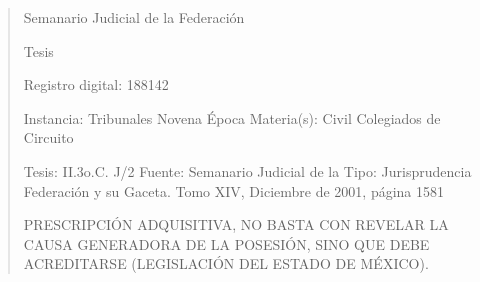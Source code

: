 \documentclass[11pt,a4paper]{article}
\begin{document}
\begin{quote}
                                                   Semanario Judicial de la Federación

                                                  Tesis

 Registro digital: 188142

 Instancia: Tribunales            Novena Época                           Materia(s): Civil
 Colegiados de Circuito

 Tesis: II.3o.C. J/2              Fuente: Semanario Judicial de la       Tipo: Jurisprudencia
                                  Federación y su Gaceta.
                                  Tomo XIV, Diciembre de 2001,
                                  página 1581


PRESCRIPCIÓN ADQUISITIVA, NO BASTA CON REVELAR LA CAUSA GENERADORA DE LA
POSESIÓN, SINO QUE DEBE ACREDITARSE (LEGISLACIÓN DEL ESTADO DE MÉXICO).



\end{quote}
\end{document}
